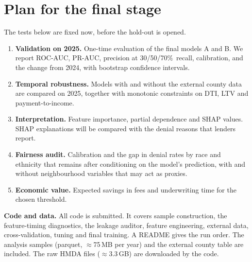 \documentclass[11pt,a4paper]{article}
\newcommand{\pct}{\%}
\begin{document}
\section{Plan for the final stage}
The tests below are fixed now, before the hold-out is opened.
\begin{enumerate}
  \item \textbf{Validation on 2025.} One-time evaluation of the final models A and B. We
  report ROC-AUC, PR-AUC, precision at 30/50/70\pct\ recall, calibration, and the change from
  2024, with bootstrap confidence intervals.
  \item \textbf{Temporal robustness.} Models with and without the external county data are
  compared on 2025, together with monotonic constraints on DTI, LTV and payment-to-income.
  \item \textbf{Interpretation.} Feature importance, partial dependence and SHAP values. SHAP
  explanations will be compared with the denial reasons that lenders report.
  \item \textbf{Fairness audit.} Calibration and the gap in denial rates by race and
  ethnicity that remains after conditioning on the model's prediction, with and without
  neighbourhood variables that may act as proxies.
  \item \textbf{Economic value.} Expected savings in fees and underwriting time for the chosen
  threshold.
\end{enumerate}

\vspace{2pt}
\textbf{Code and data.} All code is submitted. It covers sample construction, the
feature-timing diagnostics, the leakage auditor, feature engineering, external data,
cross-validation, tuning and final training. A README gives the run order. The analysis
samples (parquet, $\approx$75\,MB per year) and the external county table are included. The
raw HMDA files ($\approx$3.3\,GB) are downloaded by the code.
\end{document}
